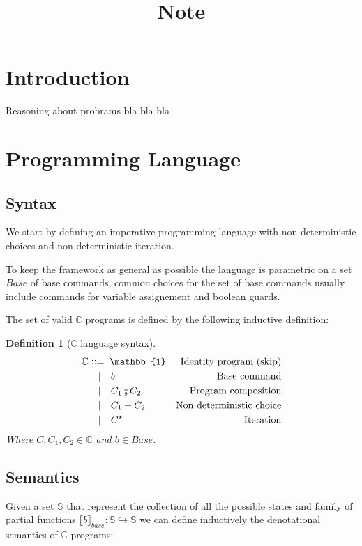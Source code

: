 \documentclass{article}
\title{Note}
\newtheorem{definition}{Definition}
\newcommand*{\sem}[1]{
    \llbracket #1 \rrbracket
}
\newcommand{\basesem}[2][A]{
    \sem{#2}_{base}
}
\def\fcmp{\mathbin{\raise 0.6ex\hbox{\oalign{\hfil$\scriptscriptstyle      
    \mathrm{o}$\hfil\cr\hfil$\scriptscriptstyle\mathrm{9}$\hfil}}}}
\def\cceq{\mathrel{\vcenter{\hbox{::}}{=}}\;}
\def\smid{\quad|\quad}
\def\prr{\hookrightarrow}
\def\lang{\mathbb{C}}
\def\state{\mathbb{S}}
\begin{document}
\section{Introduction}
Reasoning about probrams bla bla bla

\section{Programming Language}

\subsection{Syntax}
    We start by defining an imperative programming language with non 
    deterministic choices and non deterministic iteration.

    To keep the framework as general as possible the language is parametric 
    on a set $Base$ of base commands, common choices for the set of base 
    commands usually include commands for variable assignement and boolean 
    guards.

    The set of valid $\lang$ programs is defined by the following inductive 
    definition:
    \begin{definition}[$\lang$ language syntax]
        \begin{align*}
            \lang %
                  & \cceq \mathbb{1}    & \text{Identity program (skip)}\\
                  & \smid b             & \text{Base command}\\
                  & \smid C_1 \fcmp C_2 & \text{Program composition}\\
                  & \smid C_1 + C_2     & \text{Non deterministic choice}\\
                  & \smid C^\star       & \text{Iteration}\\
        \end{align*}
        Where $C, C_1, C_2 \in \lang$ and $b \in Base$.
    \end{definition}

\subsection{Semantics}
    Given a set $\state$ that represent the collection of all the possible 
    states and family of partial functions $\basesem{b} : \state \prr \state$ 
    we can define inductively the denotational semantics of $\lang$ programs:
   
\end{document}
